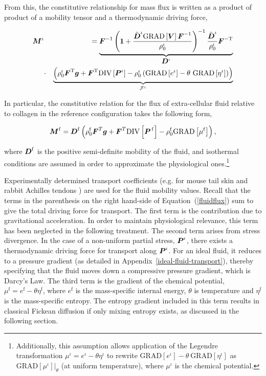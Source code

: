 \noindent From this, the constitutive relationship for mass flux is
written as a product of product of a mobility tensor and a
thermodynamic driving force,

\begin{eqnarray}
\mbox{\boldmath$ M$}^\iota & &=\underbrace{\mbox{\boldmath$ F$}^{-1}\left({\bf 1} +
  \frac{\tilde{\mbox{\boldmath$ D$}}^\iota\mathrm{GRAD}\left[\mbox{\boldmath$ V$}\right]
    \mbox{\boldmath$ F$}^{-1}}{\rho^\iota_0}\right)^{-1}
  \frac{\tilde{\mbox{\boldmath$ D$}}^\iota}{\rho^\iota_0}\mbox{\boldmath$ F$}^{-\mathrm{T}}}_{\mbox{\boldmath$ D$}^\iota}
\nonumber\\ &\cdot&\underbrace{\left(\rho_0^\iota\mbox{\boldmath$ F$}^\mathrm{T}\mbox{\boldmath$ g$} +
  \mbox{\boldmath$ F$}^\mathrm{T}\mathrm{DIV}\left[\mbox{\boldmath$ P$}^\iota\right] -
  \rho^\iota_0\left(\mathrm{GRAD}\left[e^\iota\right] -
  \theta\ \mathrm{GRAD}\left[\eta^\iota\right]\right)\right)}
_{\boldmath{{\mathcal F}}^\iota}
\label{constitutive-relation-flux-3}
\end{eqnarray}

In particular, the constitutive relation for the flux of
extra-cellular fluid relative to collagen in the reference
configuration takes the following form,

\begin{equation}
\mbox{\boldmath$ M$}^\mathrm{f} = \mbox{\boldmath$ D$}^\mathrm{f}\left(\rho_0^\mathrm{f}\mbox{\boldmath$ F$}^T\mbox{\boldmath$ g$} +
\mbox{\boldmath$ F$}^T\mathrm{DIV}\left[\mbox{\boldmath$ P$}^{\,\mathrm{f}}\right] -
\rho_0^\mathrm{f}\mathrm{GRAD}\left[\mu^\mathrm{f}\right]\right),
\label{fluidflux}
\end{equation}

\noindent where $\mbox{\boldmath$ D$}^\mathrm{f}$ is the positive semi-definite
mobility of the fluid, and isothermal conditions are assumed in order
to approximate the physiological ones.\footnote{Additionally, this
  assumption allows application of the Legendre transformation
  \mbox{$\mu^\iota = e^\iota - \theta\eta^\iota$} to rewrite
  \mbox{$\mathrm{GRAD}\left[e^\iota\right] -
    \theta\ \mathrm{GRAD}\left[\eta^\iota\right]$} as
  $\mathrm{GRAD}\left[\mu^\iota\right]\vert_\theta$ (at uniform
  temperature), where $\mu^\iota$ is the chemical potential.}

Experimentally determined transport coefficients (e.g. for mouse tail
skin \citep{Swartzetal:99} and rabbit Achilles tendons
\citep{Hanetal:2000}) are used for the fluid mobility values. Recall
that the terms in the parenthesis on the right hand-side of
\mbox{Equation (\ref{fluidflux})} sum to give the total driving force
for transport. The first term is the contribution due to gravitational
acceleration. In order to maintain physiological relevance, this term
has been neglected in the following treatment. The second term arises
from stress divergence. In the case of a non-uniform partial stress,
$\mbox{\boldmath$ P$}^\iota$, there exists a thermodynamic driving force for transport
along $\mbox{\boldmath$ P$}^\iota$. For an ideal fluid, it reduces to a pressure
gradient (as detailed in Appendix~\ref{ideal-fluid-transport}),
thereby specifying that the fluid moves down a compressive pressure
gradient, which is Darcy's Law. The third term is the gradient of the
chemical potential, $\mu^\mathrm{f} = e^\mathrm{f} - \theta
\eta^\mathrm{f}$, where $e^\mathrm{f}$ is the mass-specific internal
energy, $\theta$ is temperature and $\eta^\mathrm{f}$ is the
mass-specific entropy. The entropy gradient included in this term
results in classical Fickean diffusion if only mixing entropy exists,
as discussed in the following section.

